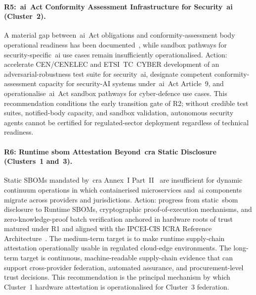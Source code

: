 \documentclass{ieeeaccess}
\begin{document}
\paragraph{R5:~\gls{ai}~Act Conformity Assessment Infrastructure for Security~\gls{ai} (Cluster~2).}
A material gap between~\gls{ai}~Act obligations and conformity-assessment body operational readiness has been documented~\cite{ep2026aiact}, while sandbox pathways for security-specific~\gls{ai} use cases remain insufficiently operationalised. Action: accelerate CEN/CENELEC and ETSI~TC~CYBER development of an adversarial-robustness test suite for security~\gls{ai}, designate competent conformity-assessment capacity for security-AI systems under~\gls{ai}~Act Article~9, and operationalise~\gls{ai}~Act sandbox pathways for cyber-defence use cases. This recommendation conditions the early transition gate of R2; without credible test suites, notified-body capacity, and sandbox validation, autonomous security agents cannot be certified for regulated-sector deployment regardless of technical readiness.

\paragraph{R6: Runtime \acrshort{sbom} Attestation Beyond~\gls{cra} Static Disclosure (Clusters~1 and~3).}
Static SBOMs mandated by~\gls{cra} Annex~I Part~II~\cite{eucra2024} are insufficient for dynamic continuum operations in which containerised microservices and~\gls{ai} components migrate across providers and jurisdictions. Action: progress from static~\gls{sbom} disclosure to Runtime SBOMs, cryptographic proof-of-execution mechanisms, and zero-knowledge-proof batch verification anchored in hardware roots of trust matured under R1 and aligned with the IPCEI-CIS ICRA Reference Architecture~\cite{ipceicis2023}. The medium-term target is to make runtime supply-chain attestation operationally usable in regulated cloud-edge environments. The long-term target is continuous, machine-readable supply-chain evidence that can support cross-provider federation, automated assurance, and procurement-level trust decisions. This recommendation is the principal mechanism by which Cluster~1 hardware attestation is operationalised for Cluster~3 federation.
\end{document}
